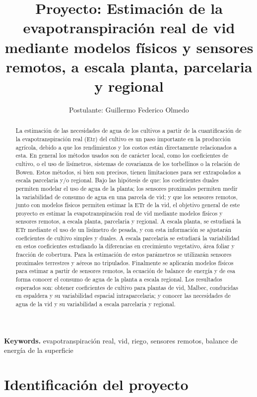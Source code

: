 \documentclass[]{article}
\title{\textbf{Proyecto:} Estimación de la evapotranspiración real de vid mediante modelos físicos y sensores remotos, a escala planta, parcelaria y regional}
\author{Postulante: Guillermo Federico Olmedo}
\date{}
\begin{document}
\maketitle

\begin{abstract}
La estimación de las necesidades de agua de los cultivos a partir de la cuantificación de la evapotranspiración real (Etr) del cultivo es un paso importante en la producción agrícola, debido a que los rendimientos y los costos están directamente relacionados a esta. En general los métodos usados son de carácter local, como los coeficientes de cultivo, o el uso de lisímetros, sistemas de covarianza de los torbellinos o la relación de Bowen. Estos métodos, si bien son precisos, tienen limitaciones para ser extrapolados a escala parcelaria y/o regional. Bajo las hipótesis de que: los coeficientes duales permiten modelar el uso de agua de la planta; los sensores proximales permiten medir la variabilidad de consumo de agua en una parcela de vid; y que los sensores remotos, junto con modelos físicos permiten estimar la ETr de la vid, el objetivo general de este proyecto es estimar la evapotranspiración real de vid mediante modelos físicos y sensores remotos, a escala planta, parcelaria y regional. A escala planta, se estudiará la ETr mediante el uso de un lisímetro de pesada, y con esta información se ajustarán coeficientes de cultivo simples y duales. A escala parcelaria se estudiará la variabilidad en estos coeficientes estudiando la diferencias en crecimiento vegetativo, área foliar y fracción de cobertura. Para la estimación de estos parámetros se utilizarán sensores proximales terrestres y aéreos no tripulados. Finalmente se aplicarán modelos físicos para estimar a partir de sensores remotos, la ecuación de balance de energía y de esa forma conocer el consumo de agua de la planta a escala regional. Los resultados esperados son: obtener coeficientes de cultivo para plantas de vid, Malbec, conducidas en espaldera y su variabilidad espacial intraparcelaria;  y conocer las necesidades de agua de la vid y su variabilidad a escala parcelaria y regional.
\end{abstract}

\smallskip
\noindent \textbf{Keywords.} evapotranspiración real, vid, riego, sensores remotos, balance de energía de la superficie

\clearpage

\section{Identificación del proyecto}
\end{document}
